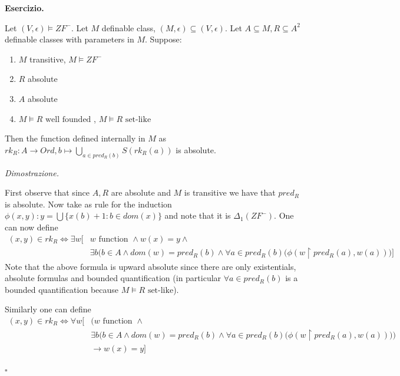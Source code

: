 \documentclass[a4paper,12pt]{article}
\newenvironment{exercise}
  {\par\vspace{1em}\noindent\textbf{Esercizio.} }
  {\par\vspace{1em}}
\newenvironment{proof}
  {\par\vspace{0.5em}\noindent\textit{Dimostrazione.} }
  {\par\vspace{1em}\hfill$\square$}
\begin{document}
\begin{exercise}

	Let $(V,\epsilon) \models ZF^{-}$. Let $M$ definable class, $(M,\epsilon) \subseteq (V,\epsilon)$. Let $A \subseteq M, R \subseteq A^2$ definable classes with parameters in $M$. Suppose:
	\begin{enumerate}
		\item	$M$ transitive, $M \models ZF^{-}$
		\item	$R$ absolute
		\item	$A$ absolute
		\item	$M \models R \text{ well founded }$, $M \models R \text{ set-like }$
	\end{enumerate}

	Then the function defined internally in $M$ as $rk_{R}: A \to Ord, b \mapsto \bigcup_{a \in pred_R(b)} S(rk_R(a))$ is absolute.

\end{exercise}

\begin{proof}

	First observe that since $A,R$ are absolute and $M$ is transitive we have that $pred_R$ is absolute.
	Now take as rule for the induction $\phi(x,y): y = \bigcup \{x(b) +1 : b \in dom(x)\}$ and note that it is $\Delta_1(ZF^{-})$.
	One can now define 
	\begin{align*}
		(x,y) \in rk_R \iff \exists w \bigg[& w \text{ function } \land w(x) = y \land \\
						&\exists b \bigg( b \in A \land dom(w) = pred_R(b) \land \forall a \in pred_R(b) ( \phi(w \restriction{pred_R(a)}, w(a)) \bigg) \bigg]
	\end{align*}
	Note that the above formula is upward absolute since there are only existentials, absolute formulas and bounded quantification (in particular $\forall a \in pred_R(b)$ is a bounded quantification
	because $M \models R \text{ set-like}$).

	Similarly one can define
	\begin{align*}
		(x,y) \in rk_R \iff \forall w \bigg[& \bigg( w \text{ function } \land \\ 
						& \exists b \big( b \in A \land dom(w) = pred_R(b) \land \forall a \in pred_R(b) ( \phi(w \restriction{pred_R(a)}, w(a)) \big) \bigg) \\
						& \to w(x) = y \bigg]
	\end{align*}

\end{proof}
\end{document}
